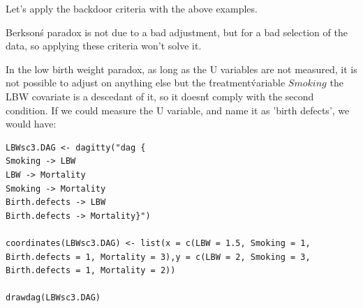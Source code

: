 \documentclass{article}
\begin{document}
Let's apply the backdoor criteria with the above examples. \par
Berkson\'s paradox is not due to a bad adjustment, but for a bad selection of the data, so applying these criteria won't solve it.\par
In the low birth weight paradox, as long as the U variables are not measured, it is not possible to adjust on anything else but the \'treatment\' variable \(Smoking\)\: the LBW covariate is a descedant of it, so it doesn\'t comply with the second condition. If we could measure the U variable, and name it as 'birth defects', we would have:\par
\begin{lstlisting}
LBWsc3.DAG <- dagitty("dag {
Smoking -> LBW
LBW -> Mortality
Smoking -> Mortality
Birth.defects -> LBW
Birth.defects -> Mortality}")

coordinates(LBWsc3.DAG) <- list(x = c(LBW = 1.5, Smoking = 1, Birth.defects = 1, Mortality = 3),y = c(LBW = 2, Smoking = 3, Birth.defects = 1, Mortality = 2))

drawdag(LBWsc3.DAG)
\end{lstlisting}
\end{document}
